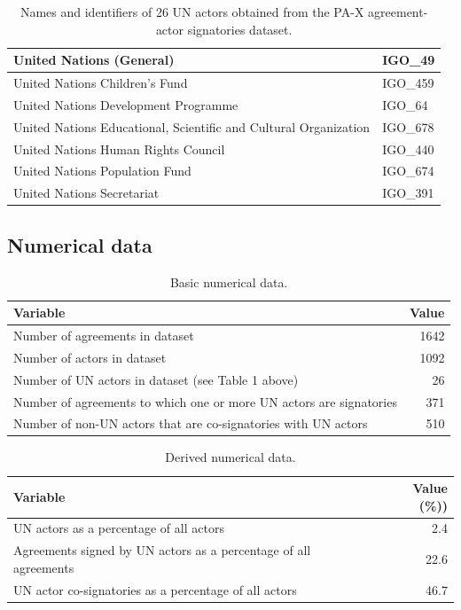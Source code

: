 \documentclass{article}
\begin{document}
\begin{table}[H]
\begin{center}
\begin{tabularx}{\textwidth}{|X|l|}
	United Nations (General) & IGO\_49 \\
	\hline
	United Nations Children's Fund & IGO\_459 \\
	\hline
	United Nations Development Programme & IGO\_64 \\
	\hline
	United Nations Educational, Scientific and Cultural Organization & IGO\_678 \\
	\hline
	United Nations Human Rights Council & IGO\_440 \\
	\hline
	United Nations Population Fund & IGO\_674 \\
	\hline
	United Nations Secretariat & IGO\_391 \\
	\hline
\end{tabularx}
\end{center}
\normalsize
\caption{Names and identifiers of 26 UN actors obtained from the PA-X agreement-actor signatories dataset. }
\end{table}

\subsection{Numerical data}

\begin{table}[H]
\begin{center}
\small
\begin{tabularx}{\textwidth}{|X|r|}
    \hline
    \textbf{Variable} & \textbf{Value} \\
    \hline
    \hline
     Number of agreements in dataset & 1642 \\
     \hline
     Number of actors in dataset & 1092 \\
     \hline
     Number of UN actors in dataset (see Table 1 above) & 26 \\
     \hline
     Number of agreements to which one or more UN actors are signatories & 371 \\
     \hline
     Number of non-UN actors that are co-signatories with UN actors  & 510  \\
     \hline
\end{tabularx}
\end{center}
\normalsize
\caption{Basic numerical data.}
\end{table}

\begin{table}[H]
\begin{center}
\small
\begin{tabularx}{\textwidth}{|X|r|}
    \hline
    \textbf{Variable} & \textbf{Value (\%))} \\
    \hline
    \hline
     UN actors as a percentage of all actors  & 2.4  \\
     \hline
     Agreements signed by UN actors as a percentage of all agreements  & 22.6  \\
     \hline
     UN actor co-signatories as a percentage of all actors & 46.7  \\
     \hline
\end{tabularx}
\end{center}
\normalsize
\caption{Derived numerical data.}
\end{table}
\end{document}
